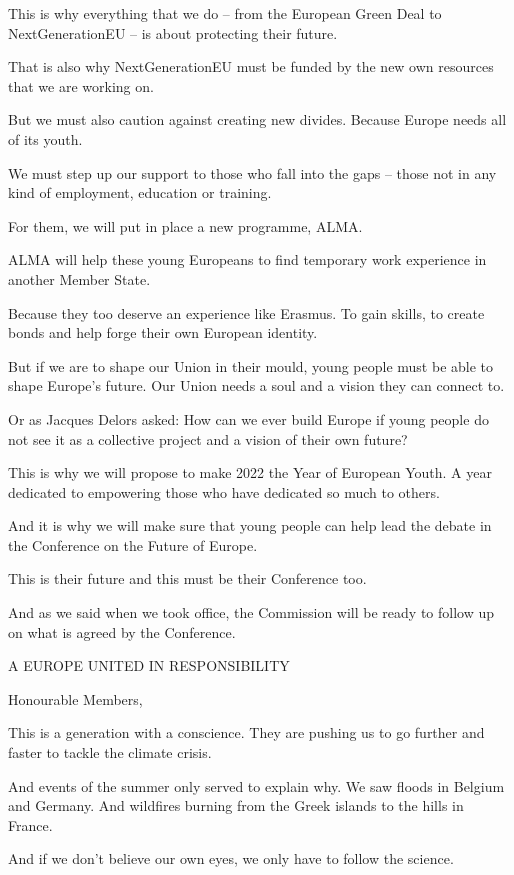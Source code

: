 \documentclass[a4paper,11pt]{article}
\begin{document}
This is why everything that we do – from the European Green Deal to NextGenerationEU – is about protecting their future. 

That is also why NextGenerationEU must be funded by the new own resources that we are working on.

But we must also caution against creating new divides. Because Europe needs all of its youth.

We must step up our support to those who fall into the gaps – those not in any kind of employment, education or training.

For them, we will put in place a new programme, ALMA.

ALMA will help these young Europeans to find temporary work experience in another Member State.

Because they too deserve an experience like Erasmus. To gain skills, to create bonds and help forge their own European identity.

But if we are to shape our Union in their mould, young people must be able to shape Europe's future.  Our Union needs a soul and a vision they can connect to.

Or as Jacques Delors asked:  How can we ever build Europe if young people do not see it as a collective project and a vision of their own future?

This is why we will propose to make 2022 the Year of European Youth. A year dedicated to empowering those who have dedicated so much to others.

And it is why we will make sure that young people can help lead the debate in the Conference on the Future of Europe.

This is their future and this must be their Conference too.

And as we said when we took office, the Commission will be ready to follow up on what is agreed by the Conference. 

 

A EUROPE UNITED IN RESPONSIBILITY

Honourable Members,

This is a generation with a conscience. They are pushing us to go further and faster to tackle the climate crisis.

And events of the summer only served to explain why. We saw floods in Belgium and Germany. And wildfires burning from the Greek islands to the hills in France.

And if we don't believe our own eyes, we only have to follow the science.
\end{document}
